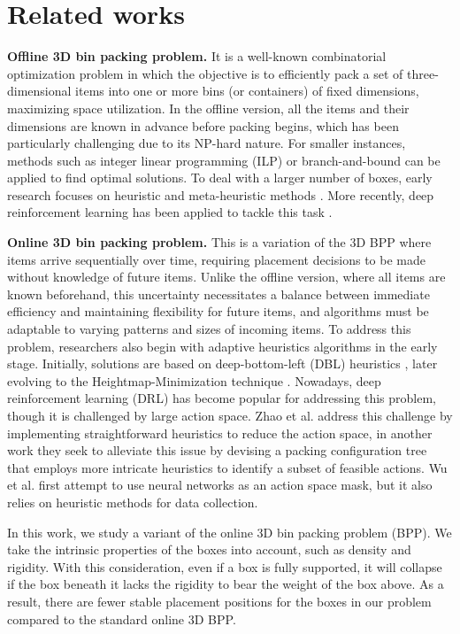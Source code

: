 \section{Related works}
\label{section:related works}

\textbf{Offline 3D bin packing problem. }It is a well-known combinatorial optimization problem in which the objective is to efficiently pack a set of three-dimensional items into one or more bins (or containers) of fixed dimensions, maximizing space utilization. In the offline version, all the items and their dimensions are known in advance before packing begins, which has been particularly challenging due to its NP-hard nature. For smaller instances, methods such as integer linear programming (ILP) or branch-and-bound can be applied to find optimal solutions. To deal with a larger number of boxes, early research focuses on heuristic and meta-heuristic methods \cite{faroe2003guided} \cite{crainic2009ts2pack} \cite{kang2012hybrid}. More recently, deep reinforcement learning has been applied to tackle this task \cite{hu2020tap} \cite{zhang2021attend2pack}.

\textbf{Online 3D bin packing problem. }This is a variation of the 3D BPP where items arrive sequentially over time, requiring placement decisions to be made without knowledge of future items. Unlike the offline version, where all items are known beforehand, this uncertainty necessitates a balance between immediate efficiency and maintaining flexibility for future items, and algorithms must be adaptable to varying patterns and sizes of incoming items. To address this problem, researchers also begin with adaptive heuristics algorithms in the early stage. Initially, solutions are based on deep-bottom-left (DBL) heuristics\cite{karabulut2004hybrid} \cite{ha2017online}, later evolving to the Heightmap-Minimization technique \cite{wang2019stable}. Nowadays, deep reinforcement learning (DRL) has become popular for addressing this problem, though it is challenged by large action space. Zhao et al. \cite{zhao2021online} address this challenge by implementing straightforward heuristics to reduce the action space, in another work they \cite{zhao2022learning} seek to alleviate this issue by devising a packing configuration tree that employs more intricate heuristics to identify a subset of feasible actions. Wu et al. \cite{wu2024efficient} first attempt to use neural networks as an action space mask, but it also relies on heuristic methods for data collection. 

In this work, we study a variant of the online 3D bin packing problem (BPP). We take the intrinsic properties of the boxes into account, such as density and rigidity. With this consideration, even if a box is fully supported, it will collapse if the box beneath it lacks the rigidity to bear the weight of the box above. As a result, there are fewer stable placement positions for the boxes in our problem compared to the standard online 3D BPP.

